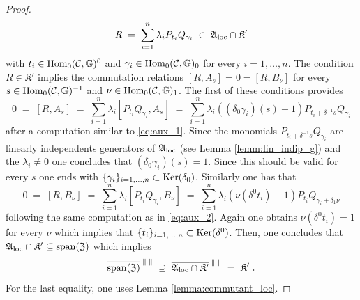 \documentclass[a4paper,12pt,twoside,reqno]{amsart}
\theoremstyle{plain}
\theoremstyle{definition}
\theoremstyle{remark}
\numberwithin{equation}{section}
\numberwithin{figure}{section}
\numberwithin{table}{section}
\newcommand{\f}[1]{\mathcal{#1}}
\newcommand{\n}[1]{\mathbb{#1}}
\begin{document}
\begin{proof}
		\[
		R\;=\;\sum_{i=1}^n\lambda_{i}P_{t_i}Q_{\gamma_i}\;\in\;\mathfrak{A}_{\rm loc}\cap \mathfrak{K}'
		\]
		with $t_i\in {\rm Hom}_0(\f{C},\n{G})^0$ and $\gamma_i\in {\rm Hom}_0(\f{C},\n{G})_0$ for every $i=1,\ldots,n$. The condition $R\in \mathfrak{K}'$ implies the commutation relations $[R,A_s]=0=[R,B_\nu]$
		for every $s\in {\rm Hom}_0(\f{C},\n{G})^{-1}$ and $\nu\in {\rm Hom}_0(\f{C},\n{G})_{1}$. The first of these conditions provides
		\[
		0\;=\;[R,A_s]\;=\;\sum_{i=1}^n\lambda_{i}[P_{t_i}Q_{\gamma_i},A_s]\;=\;
		\sum_{i=1}^n\lambda_{i}((\delta_0\gamma_i)(s)-1)P_{t_i+\delta^{-1}s}Q_{\gamma_i}
		\]
		after a computation similar to \eqref{eq:aux_1}. Since the monomials 
		$P_{t_i+\delta^{-1}s}Q_{\gamma_i}$ are linearly independents generators of $\mathfrak{A}_{\rm loc}$ (see Lemma \ref{lemm:lin_indip_g}) and the $\lambda_i\neq 0$ one concludes that $(\delta_0\gamma_i)(s)=1$. Since this should be valid for every $s$ one ends with $\{\gamma_i\}_{i=1,\ldots,n}\subset {\rm Ker}(\delta_0)$. Similarly one has that  
		\[
		0\;=\;[R,B_\nu]\;=\;\sum_{i=1}^n\lambda_{i}[P_{t_i}Q_{\gamma_i},B_\nu]\;=\;
		\sum_{i=1}^n\lambda_{i}(\nu(\delta^0t_i)-1)P_{t_i}Q_{\gamma_i+\delta_1\nu}
		\]
		following the same computation as in \eqref{eq:aux_2}. Again one obtains $\nu(\delta^0t_i)=1$ for every $\nu$ which implies that 
		$\{t_i\}_{i=1,\ldots,n}\subset {\rm Ker}(\delta^0)$. Then, one concludes that $
		\mathfrak{A}_{\rm loc}\cap\mathfrak{K}'\subseteq\mathrm{span}(\mathfrak{Z})$ which implies
		\[
		\overline{\mathrm{span}(\mathfrak{Z})}^{\;\|\;\|}\;\supseteq\;\overline{\mathfrak{A}_{\rm loc}\cap\mathfrak{K}'}^{\;\|\;\|}
		\;=\;\mathfrak{K}'\;.
		\] 
		For the last equality, one uses Lemma \ref{lemma:commutant_loc}.
	\end{proof}
	
	
	
	
	
	\medskip
	
	
	
	
	
\end{document}
